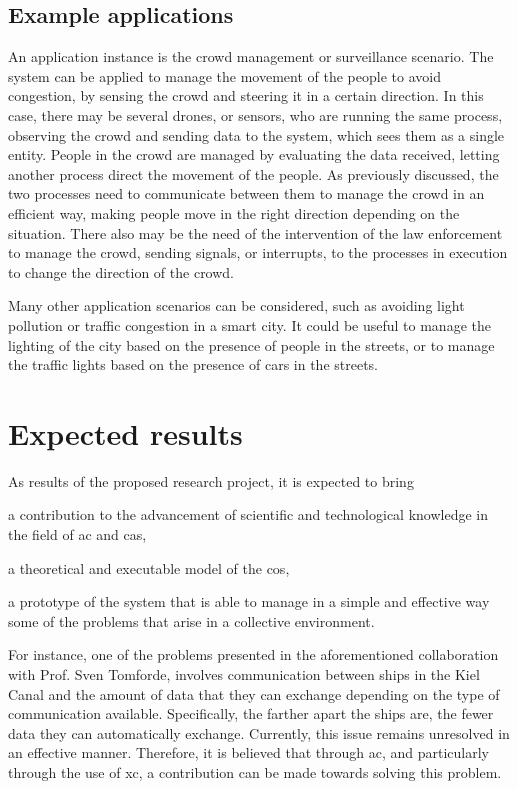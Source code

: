 \documentclass[12pt, a4paper]{article}
\newenvironment{inlinelist}{\begin{enumerate*}[label=\emph{(\roman*)}]}{\end{enumerate*}}
\begin{document}
\subsection{Example applications}
\label{subsec:example-applications}
An application instance is the crowd management or surveillance scenario.
%
The system can be applied to manage the movement of the people to avoid congestion,
by sensing the crowd and steering it in a certain direction.
%
In this case,
there may be several drones, or sensors, who are running the same process,
observing the crowd and sending data to the system,
which sees them as a single entity.
%
People in the crowd are managed by evaluating the data received,
letting another process direct the movement of the people.
%
As previously discussed,
the two processes need to communicate between them to manage the crowd in an efficient way,
making people move in the right direction depending on the situation.
%
There also may be the need of the intervention of the law enforcement to manage the crowd,
sending signals, or interrupts,
to the processes in execution to change the direction of the crowd.

Many other application scenarios can be considered,
such as avoiding light pollution or traffic congestion in a smart city.
%
It could be useful to manage the lighting of the city based on the presence of people in the streets,
or to manage the traffic lights based on the presence of cars in the streets.

\section{Expected results}
\label{sec:expected-results}

As results of the proposed research project,
it is expected to bring
\begin{inlinelist}
    \item a contribution to the advancement of scientific and technological knowledge in the field of \ac{ac} and \ac{cas},
    \item a theoretical and executable model of the \ac{cos},
    \item a prototype of the system that is able to manage in a simple and effective way some of the problems that arise in a collective environment.
\end{inlinelist}
%
For instance,
one of the problems presented in the aforementioned collaboration with Prof. Sven Tomforde,
involves communication between ships in the Kiel Canal and the amount of data that they can exchange depending on the
type of communication available.
%
Specifically,
the farther apart the ships are,
the fewer data they can automatically exchange.
%
Currently,
this issue remains unresolved in an effective manner.
%
Therefore,
it is believed that through \ac{ac},
and particularly through the use of \ac{xc},
a contribution can be made towards solving this problem.
\end{document}
